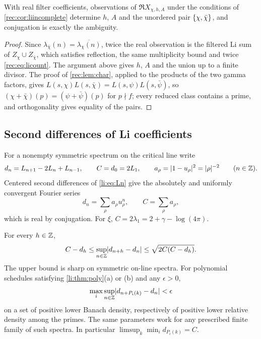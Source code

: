 \begin{corollary}\label{rec:cor:lireal}
With real filter coefficients, observations of $\Re X_{\chi,h,A}$ under the conditions of
\cref{rec:cor:liincomplete} determine $h$, $A$ and the unordered pair $\{\chi,\bar\chi\}$, and
conjugation is exactly the ambiguity.
\end{corollary}

\begin{proof}
Since $\lambda_{\bar\chi}(n)=\overline{\lambda_\chi(n)}$, twice the real observation is the filtered
Li sum of $Z_\chi\cup Z_{\bar\chi}$, which satisfies reflection, the same multiplicity bound and twice
\eqref{rec:eq:licount}. The argument above gives $h$, $A$ and the union up to a finite divisor. The
proof of \cref{rec:lem:char}, applied to the products of the two gamma factors, gives
$L(s,\chi)L(s,\bar\chi)=L(s,\psi)L(s,\bar\psi)$, so $(\chi+\bar\chi)(p)=(\psi+\bar\psi)(p)$ for
$p\nmid f$; every reduced class contains a prime, and orthogonality gives equality of the pairs.
\end{proof}

\subsection{Second differences of Li coefficients}\label{li:sec:curv}

For a nonempty symmetric spectrum on the critical line write
\[
 d_n=L_{n+1}-2L_n+L_{n-1},\qquad C=d_0=2L_1,\qquad a_\rho=\lvert1-u_\rho\rvert^2=\lvert\rho\rvert^{-2}\qquad(n\in\mathbb{Z}).
\]
Centered second differences of \eqref{li:eq:Ln} give the absolutely and uniformly convergent
Fourier series
\begin{equation}\label{li:eq:fourier}
 d_n=\sum_\rho a_\rho u_\rho^n,\qquad C=\sum_\rho a_\rho ,
\end{equation}
which is real by conjugation. For $\xi$, $C=2\lambda_1=2+\gamma-\log(4\pi)$.

\begin{theorem}\label{li:thm:curv}
For every $h\in\mathbb{Z}$,
\begin{equation}\label{li:eq:curvcert}
 C-d_h\le\sup_{n\in\mathbb{Z}}\lvert d_{n+h}-d_n\rvert\le\sqrt{2C(C-d_h)} .
\end{equation}
The upper bound is sharp on symmetric on-line spectra. For polynomial schedules satisfying
\cref{li:thm:poly}\textup{(a)} or \textup{(b)} and any $\epsilon>0$,
\[
 \max_i\sup_{n\in\mathbb{Z}}\lvert d_{n+P_i(k)}-d_n\rvert<\epsilon
\]
on a set of positive lower Banach density, respectively of positive lower relative density
among the primes. The same parameters work for any prescribed finite family of such spectra. In
particular $\limsup_k\min_id_{P_i(k)}=C$.
\end{theorem}

